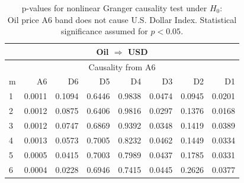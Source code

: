 %
%
\begin{table}[H]
\begin{center}
\begin{tabular}{l|r r r r r r r}
\hline\hline
\multicolumn{8}{c}{Oil $\Rightarrow$ USD}\\
\hline
\multicolumn{8}{c}{Causality from A6}\\
\hline\hline
m & A6 & D6 & D5 & D4 & D3 & D2 & D1 \\
\hline
1 & \cellcolor{mygreen}0.0011 & 0.1094 & 0.6446 & 0.9838 & \cellcolor{mygreen}0.0474 & 0.0945 & \cellcolor{mygreen}0.0201 \\
2 & \cellcolor{mygreen}0.0012 & 0.0875 & 0.6406 & 0.9816 & \cellcolor{mygreen}0.0297 & 0.1376 & \cellcolor{mygreen}0.0168 \\
3 & \cellcolor{mygreen}0.0012 & 0.0747 & 0.6869 & 0.9392 & \cellcolor{mygreen}0.0348 & 0.1419 & \cellcolor{mygreen}0.0389 \\
4 & \cellcolor{mygreen}0.0013 & 0.0573 & 0.7005 & 0.8232 & \cellcolor{mygreen}0.0462 & 0.1449 & \cellcolor{mygreen}0.0334 \\
5 & \cellcolor{mygreen}0.0005 & \cellcolor{mygreen}0.0415 & 0.7003 & 0.7989 & \cellcolor{mygreen}0.0437 & 0.1785 & \cellcolor{mygreen}0.0331 \\
6 & \cellcolor{mygreen}0.0004 & \cellcolor{mygreen}0.0228 & 0.6946 & 0.7415 & \cellcolor{mygreen}0.0445 & 0.2626 & \cellcolor{mygreen}0.0377 \\
\hline\hline
\end{tabular}
\caption{p-values for nonlinear Granger causality test under $H_0$:\\
Oil price A6 band does not cause U.S. Dollar Index. Statistical significance assumed for $p<0.05$.}
\end{center}
\end{table}

